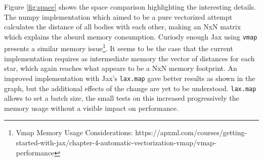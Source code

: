 \documentclass[a4paper, 11pt]{article}         %
\begin{document}
Figure \ref{fig:space} shows the space comparison highlighting the interesting details. The numpy implementation which aimed to be a pure vectorized attempt
calculates the distance of all bodies with each other, making an NxN matrix which explains the absurd memory consumption.
Curiosly enough Jax using \texttt{vmap} presents a similar memory issue\footnote{Vmap Memory Usage Considerations: https://apxml.com/courses/getting-started-with-jax/chapter-4-automatic-vectorization-vmap/vmap-performance}.
It seems to be the case that the current implementation requires as intermediate memory the vector of distances for each star, which again reaches 
what appears to be a NxN memory footprint.
An improved implementation with Jax's \texttt{lax.map} gave better results as shown in the graph, but the additional effects of the change are yet to be understood.
\texttt{lax.map} allows to set a batch size, the small tests on this increased progressively the memory usage without a visible impact on performance.
\end{document}
